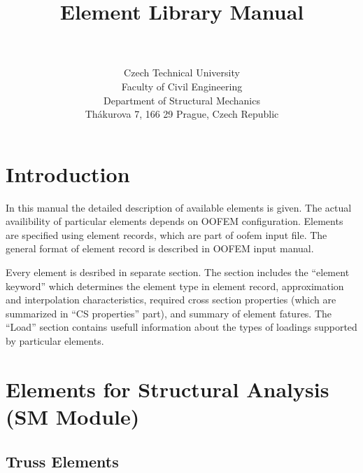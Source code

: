 \documentclass[12pt,dvips]{article}
\begin{document}
\title{\oofem Element Library Manual}
\author{\bp \\ \\
Czech Technical University\\
Faculty of Civil Engineering\\
Department of Structural Mechanics\\
Th\'akurova 7, 166 29 Prague, Czech Republic
}
\maketitle
\newpage
\tableofcontents
\listoffigures

\section{Introduction}
In this manual the detailed description of available elements 
is given. The actual availibility of particular elements depends on
OOFEM configuration. Elements are specified using element records,
which are part of oofem input file. The general format of element
record is described in OOFEM input manual. 

Every element is desribed in separate section. The section includes the ``element keyword'' which
determines the element type in element record, approximation and
interpolation characteristics, required cross section properties
(which are summarized in ``CS properties'' part), and summary of
element fatures. The ``Load'' section contains usefull
information about the types of loadings supported by particular elements.



\section{Elements for Structural Analysis (SM Module)}
\subsection{Truss Elements}
\end{document}
